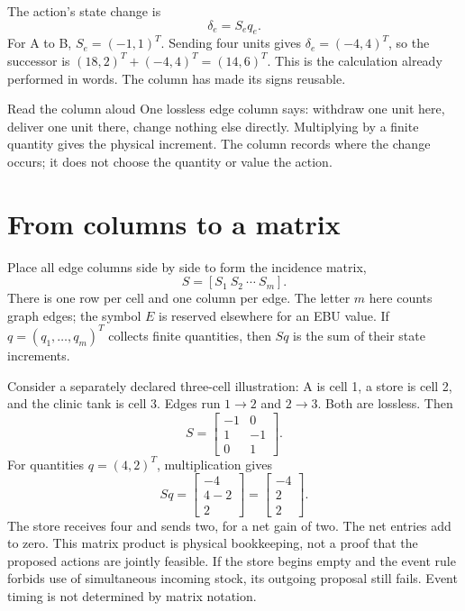 The action's state change is
\begin{equation}
 \delta_e=S_e q_e.
\end{equation}
For A to B, \(S_e=(-1,1)^T\). Sending four units gives \(\delta_e=(-4,4)^T\), so the successor is \((18,2)^T+(-4,4)^T=(14,6)^T\). This is the calculation already performed in words. The column has made its signs reusable.

\begin{intuitionbox}{Read the column aloud}
One lossless edge column says: withdraw one unit here, deliver one unit there, change nothing else directly. Multiplying by a finite quantity gives the physical increment. The column records where the change occurs; it does not choose the quantity or value the action.
\end{intuitionbox}

\section{From columns to a matrix}
Place all edge columns side by side to form the incidence matrix,
\begin{equation}
 S=[S_1\ S_2\ \cdots\ S_m].
\end{equation}
There is one row per cell and one column per edge. The letter \(m\) here counts graph edges; the symbol \(E\) is reserved elsewhere for an EBU value. If \(q=(q_1,\ldots,q_m)^T\) collects finite quantities, then \(Sq\) is the sum of their state increments.

Consider a separately declared three-cell illustration: A is cell 1, a store is cell 2, and the clinic tank is cell 3. Edges run \(1\to2\) and \(2\to3\). Both are lossless. Then
\begin{equation}
 S=\begin{bmatrix}-1&0\\1&-1\\0&1\end{bmatrix}.
\end{equation}
For quantities \(q=(4,2)^T\), multiplication gives
\begin{equation}
 Sq=\begin{bmatrix}-4\\4-2\\2\end{bmatrix}
    =\begin{bmatrix}-4\\2\\2\end{bmatrix}.
\end{equation}
The store receives four and sends two, for a net gain of two. The net entries add to zero. This matrix product is physical bookkeeping, not a proof that the proposed actions are jointly feasible. If the store begins empty and the event rule forbids use of simultaneous incoming stock, its outgoing proposal still fails. Event timing is not determined by matrix notation.

